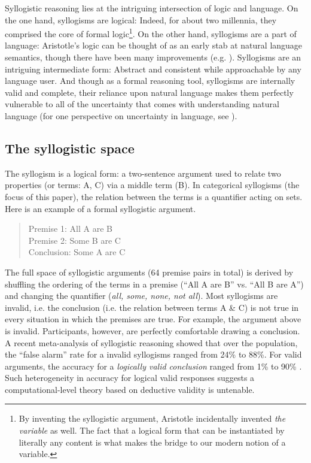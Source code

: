 \documentclass{llncs} %
\begin{document}
Syllogistic reasoning lies at the intriguing intersection of logic and language. On the one hand, syllogisms are logical: Indeed, for about two millennia, they comprised the core of formal logic\footnote{By inventing the syllogistic argument, Aristotle incidentally invented \emph{the variable} as well. The fact that a logical form that can be instantiated by literally any content is what makes the bridge to our modern notion of a variable.}. On the other hand, syllogisms are a part of language: Aristotle's logic can be thought of as an early stab at natural language semantics, though there have been many improvements (e.g. ). Syllogisms are an intriguing intermediate form: Abstract and consistent while approachable by any language user. And though as a formal reasoning tool, syllogisms are internally valid and complete, their reliance upon natural language makes them perfectly vulnerable to all of the uncertainty that comes with understanding natural language (for one perspective on uncertainty in language, see ).

\subsection{The syllogistic space}

The syllogism is a logical form: a two-sentence argument used to relate two properties (or terms: A, C) via a middle term (B). In categorical syllogisms (the focus of this paper), the relation between the terms is a quantifier acting on sets. Here is an example of a formal syllogistic argument.
\begin{quote}
Premise 1: All A are B\\
Premise 2: Some B are C\\
Conclusion: Some A are C
\end{quote}
The full space of syllogistic arguments (64 premise pairs in total) is derived by shuffling the ordering of the terms in a premise (``All A are B'' vs. ``All B are A'') and changing the quantifier (\emph{all, some, none, not all}). Most syllogisms are invalid, i.e. the conclusion (i.e. the relation between terms A \& C) is not true in every situation in which the premises are true. For example, the argument above is invalid. Participants, however, are perfectly comfortable drawing a conclusion. A recent meta-analysis of syllogistic reasoning showed that over the population, the ``false alarm'' rate for a invalid syllogisms ranged from 24\% to 88\%. For valid arguments, the accuracy for a \emph{logically valid conclusion} ranged from 1\% to 90\% \cite{Khemlani2012}. Such heterogeneity in accuracy for logical valid responses suggests a computational-level theory based on deductive validity is untenable. 
\end{document}
